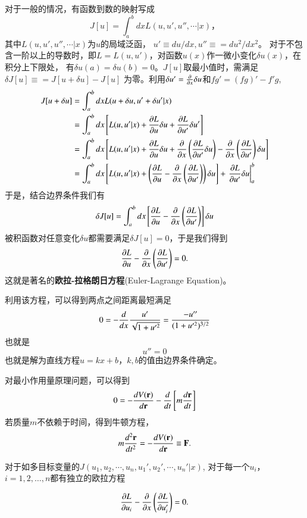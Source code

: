 对于一般的情况，有函数到数的映射写成
\begin{equation}
  J[u] = \int_{a}^{b}  dx L(u, u', u'', \cdots| x)， 
\end{equation}
其中$L(u, u', u'',\cdots | x)$为$u$的局域泛函， $u' \equiv du/dx, u'' \equiv = du^2/dx^2$。
对于不包含一阶以上的导数时，即$L = L(u,u')$，对函数$u(x)$作一微小变化$\delta u(x)$，在积分上下限处，
有$\delta u(a) = \delta u(b) = 0$。$J[u]$取最小值时，需满足$\delta J[u] \equiv = J[u + \delta u] - J[u]$
为零。利用$\delta u' = \frac{\partial{}}{\partial{x}} \delta u$和$fg' = (fg)' - f'g$,
\begin{align}
  J[u + \delta u] &= \int_{a}^{b}  dx L(u + \delta u, u' + \delta u'| x) 
    \nonumber \\ 
    &= \int_{a}^{b} dx \left[ L(u, u'| x) + \funcpd{L}{u} \delta u + \funcpd{L}{u'} \delta u' \right]  
    \nonumber \\ 
    &= \int_{a}^{b} dx \left[ L(u, u'| x) + \funcpd{L}{u} \delta u + \funcpd{}{x}\left( \funcpd{L}{u'} \delta u \right)
    -  \funcpd{}{x}\left( \funcpd{L}{u'} \right) \delta u  \right]  
    \nonumber \\ 
    &= \int_{a}^{b} dx \left[ L(u, u'| x) + \left( \funcpd{L}{u} -  \funcpd{}{x}\left( \funcpd{L}{u'} \right)   \right) \delta u \right]  
        + \left. \funcpd{L}{u'} \delta u \right|_{a}^{b} 
     \nonumber %
\end{align}
于是，结合边界条件我们有
\begin{align}
  \delta J[u] = \int_{a}^{b} dx \left[ \frac{\partial{L}}{\partial{u}} -  \frac{\partial{}}{\partial{x}}\left( \frac{\partial{L}}{\partial{u'}} \right)   \right] \delta u 
\end{align}
被积函数对任意变化$\delta u$都需要满足$\delta J[u] = 0$，于是我们得到
\begin{equation}
  \frac{\partial{L}}{\partial{u}} -  \frac{\partial{}}{\partial{x}}\left( \frac{\partial{L}}{\partial{u'}} \right) = 0 .
\end{equation}
这就是著名的\textbf{欧拉-拉格朗日方程}(Euler-Lagrange Equation)。

利用该方程，可以得到两点之间距离最短满足
\[
  0 = - \frac{d{}}{d{x}} \frac{u'}{\sqrt{1 + u'^2}} = \frac{-u''}{(1+ u'^2)^{3/2}}
\]
也就是
\[ u'' = 0\]
也就是解为直线方程$ u = k x + b$，$k,b$的值由边界条件确定。

对最小作用量原理问题，可以得到
\[
  0 = - \frac{d{V({\mathbf{r}})}}{d{{\mathbf{r}}}} - \frac{d{}}{d{t}} \left[ m \frac{d{\mathbf{r}}}{dt} \right]
\]
若质量$m$不依赖于时间，得到牛顿方程，
\[
  m \frac{d^2{\mathbf{r}}}{dt^2} = - \frac{d{V({\mathbf{r}})}}{d{{\mathbf{r}}}} \equiv {\mathbf{F}} .
\]

对于如多目标变量的$J(u_1, u_2, \cdots, u_n, u_1', u_2', \cdots, u_n'|x)$, 对于每一个$u_i$， $i=1,2,\dots,n$都有独立的欧拉方程

\begin{equation}
  \frac{\partial{L}}{\partial{u_i}} -  \frac{\partial{}}{\partial{x}}\left( \frac{\partial{L}}{\partial{u'_i}} \right) = 0 .
\end{equation}





